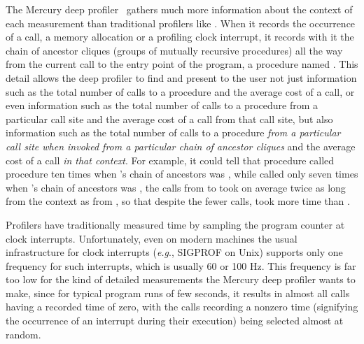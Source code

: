 

The Mercury deep profiler~\cite{conway:2001:mercury-deep}
gathers much more information about the context of each measurement
than traditional profilers like \cite{gprof}.
When it records the occurrence
of a call, a memory allocation or a profiling clock interrupt,
it records with it the chain of ancestor cliques
(groups of mutually recursive procedures)
all the way from the current call to the entry point of the program,
a procedure named .
This detail allows the deep profiler
to find and present to the user
not just information such as the total number of calls to a procedure
and the average cost of a call,
or even information such as the total number of calls to a procedure
from a particular call site and the average cost of a call from that call site,
but also information such as the total number of calls to a procedure
\emph{from a particular call site
when invoked from a particular chain of ancestor cliques}
and the average cost of a call \emph{in that context}.
For example, it could tell that
procedure  called procedure  ten times
when 's chain of ancestors was ,
while  called  only seven times
when 's chain of ancestors was ,
the calls from  to  took on average twice as long
from the  context as from ,
so that despite the fewer calls,
 took more time than .

Profilers have traditionally measured time
by sampling the program counter at clock interrupts.
Unfortunately, even on modern machines
the usual infrastructure for clock interrupts (\emph{e.g}., SIGPROF on Unix)
supports only one frequency for such interrupts,
which is usually 60 or 100 Hz.
This frequency is far too low for the kind of detailed measurements
the Mercury deep profiler wants to make,
since for typical program runs of few seconds,
it results in almost all calls having a recorded time of zero,
with the calls recording a nonzero time
(signifying the occurrence of an interrupt during their execution)
being selected almost at random.

